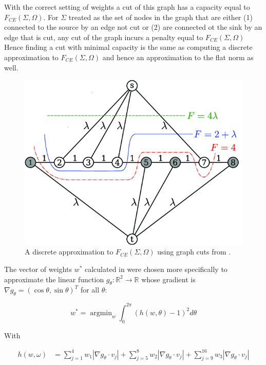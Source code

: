 \documentclass[12pt]{article}
\DeclareMathOperator*{\argmin}{argmin}
\begin{document}
With the correct setting of weights a cut of this graph has a capacity equal to $F_{CE}(\Sigma,\Omega)$. For $\Sigma$ treated as the set of nodes in the graph that are either (1) connected to the source by an edge not cut or (2) are connected ot the sink by an edge that is cut, any cut of the graph incurs a penalty equal to $F_{CE}(\Sigma,\Omega)$ Hence finding a cut with minimal capacity is the same as computing a discrete approximation to $F_{CE}(\Sigma,\Omega)$ and hence an approximation to the flat norm as well. 

\begin{figure}[H]
	\centering
	\includegraphics[scale=1]{graph-cut-for-a-1-dimensional-image.png}
	\caption{A discrete approximation to $F_{CE}(\Sigma,\Omega)$ using graph cuts from \cite{Morgan_2007}.}
\end{figure}

The vector of weights $w^*$ calculated in \cite{shapes} were chosen more specifically to approximate the linear function $g_\theta:\mathbb{R}^2 \to \mathbb{R}$ whose gradient is $\nabla g_\theta = (\cos \theta, \sin \theta)^T$ for all $\theta$:

\begin{equation} \label{oldmin}
w^* = \argmin_w \int_0^{2\pi} (h(w,\theta)-1)^2 d\theta
\end{equation}

With

\begin{align*}
h(w,\omega) &= \sum_{j=1}^4 w_1 |\nabla g_\theta \cdot v_j| + \sum_{j=5}^8 w_2 |\nabla g_\theta \cdot v_j| +  \sum_{j=9}^{16} w_3 |\nabla g_\theta \cdot v_j|
\end{align*}
\end{document}
